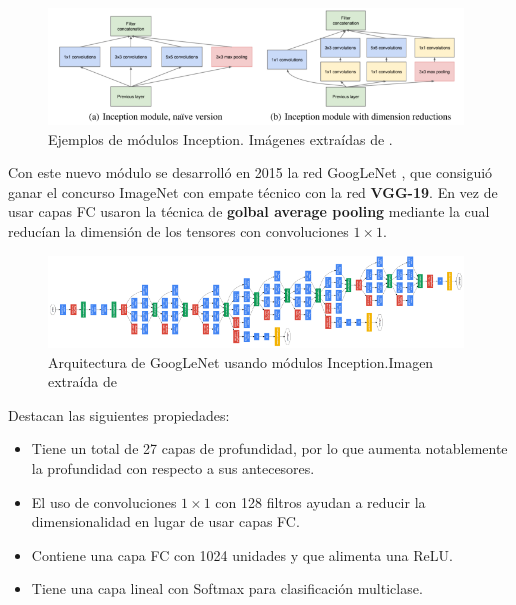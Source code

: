             \begin{figure}[!h]
                \centering
                \includegraphics[width=0.98\textwidth]{img/inception_module.png}
                \caption{Ejemplos de módulos Inception. Imágenes extraídas de \cite{StanfordCourse}.}
                \label{fig:inception}
            \end{figure}

            \noindent Con este nuevo módulo se desarrolló en 2015 la red GoogLeNet \cite{szegedy2015going}, que consiguió ganar el concurso ImageNet con empate técnico con la red \textbf{VGG-19}. En vez de usar capas FC usaron la técnica de \textbf{golbal average pooling} mediante la cual reducían la dimensión de los tensores con convoluciones $1 \times 1$.

            \begin{figure}[!h]
                \centering
                \includegraphics[width=0.98\textwidth]{img/GoogLeNet.png}
                \caption{Arquitectura de GoogLeNet usando módulos Inception.Imagen extraída de \cite{StanfordCourse}}
                \label{fig:GoogLeNet}
            \end{figure}

            \noindent Destacan las siguientes propiedades:

            \begin{itemize}
                \item Tiene un total de 27 capas de profundidad, por lo que aumenta notablemente la profundidad con respecto a sus antecesores.
                \item El uso de convoluciones $1\times 1$ con 128 filtros ayudan a reducir la dimensionalidad en lugar de usar capas FC.
                \item Contiene una capa FC con 1024 unidades y que alimenta una ReLU. 
                \item Tiene una capa lineal con Softmax para clasificación multiclase.
            \end{itemize}

